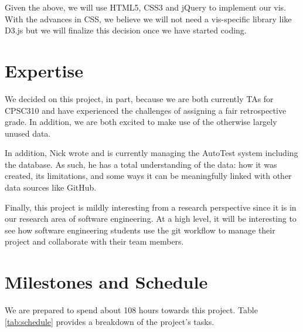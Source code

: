 \documentclass[preprint,journal]{vgtc}       %
\begin{document}
Given the above, we will use HTML5, CSS3 and jQuery to implement our vis. With the
advances in CSS, we believe we will not need a vis-specific library like D3.js but
we will finalize this decision once we have started coding.

\section{Expertise}
We decided on this project, in part, because we are both currently TAs for CPSC310
and have experienced the challenges of assigning a fair retrospective grade. In
addition, we are both excited to make use of the otherwise largely unused data.

In addition, Nick wrote and is currently managing the AutoTest system including
the database. As such, he has a total understanding of the data: how it was created,
its limitations, and some ways it can be meaningfully linked with other data sources
like GitHub.

Finally, this project is mildly interesting from a research perspective since it
is in our research area of software engineering. At a high level, it will be
interesting to see how software engineering students use the git workflow to
manage their project and collaborate with their team members.

\section{Milestones and Schedule}
We are prepared to spend about 108 hours towards this project. Table \ref{tab:schedule} provides
a breakdown of the project's tasks.
\end{document}
